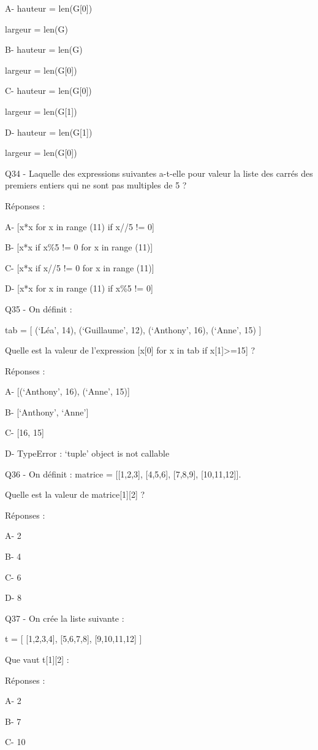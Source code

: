 \documentclass[
]{book}
\begin{document}
A- hauteur = len(G{[}0{]})

largeur = len(G)

B- hauteur = len(G)

largeur = len(G{[}0{]})

C- hauteur = len(G{[}0{]})

largeur = len(G{[}1{]})

D- hauteur = len(G{[}1{]})

largeur = len(G{[}0{]})

Q34 - Laquelle des expressions suivantes a-t-elle pour valeur la liste des carrés des premiers entiers qui ne sont pas multiples de 5 ?

Réponses :

A- {[}x*x for x in range (11) if x//5 != 0{]}

B- {[}x*x if x\%5 != 0 for x in range (11){]}

C- {[}x*x if x//5 != 0 for x in range (11){]}

D- {[}x*x for x in range (11) if x\%5 != 0{]}

Q35 - On définit :

tab = {[} (`Léa', 14), (`Guillaume', 12), (`Anthony', 16), (`Anne', 15) {]}

Quelle est la valeur de l'expression {[}x{[}0{]} for x in tab if x{[}1{]}\textgreater=15{]} ?

Réponses :

A- {[}(`Anthony', 16), (`Anne', 15){]}

B- {[}`Anthony', `Anne'{]}

C- {[}16, 15{]}

D- TypeError : `tuple' object is not callable

Q36 - On définit : matrice = {[}{[}1,2,3{]}, {[}4,5,6{]}, {[}7,8,9{]}, {[}10,11,12{]}{]}.

Quelle est la valeur de matrice{[}1{]}{[}2{]} ?

Réponses :

A- 2

B- 4

C- 6

D- 8

Q37 - On crée la liste suivante :

t = {[} {[}1,2,3,4{]}, {[}5,6,7,8{]}, {[}9,10,11,12{]} {]}

Que vaut t{[}1{]}{[}2{]} :

Réponses :

A- 2

B- 7

C- 10
\end{document}
